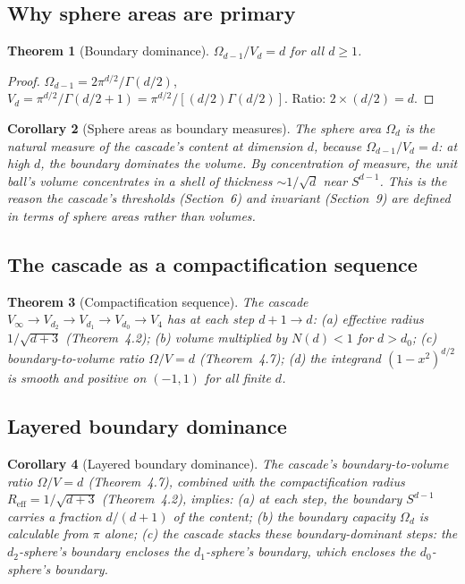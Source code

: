 \documentclass[11pt,a4paper]{article}
\newtheorem{theorem}{Theorem}[section]
\newtheorem{corollary}[theorem]{Corollary}
\begin{document}
\subsection{Why sphere areas are primary}

\begin{theorem}[Boundary dominance]
$\Omega_{d-1}/V_d = d$ for all $d\geq 1$.
\end{theorem}

\begin{proof}
$\Omega_{d-1} = 2\pi^{d/2}/\Gamma(d/2)$, $V_d = \pi^{d/2}/\Gamma(d/2+1) = \pi^{d/2}/[(d/2)\Gamma(d/2)]$. Ratio: $2\times(d/2) = d$.
\end{proof}

\begin{corollary}[Sphere areas as boundary measures]
The sphere area $\Omega_d$ is the natural measure of the cascade's content at dimension $d$, because $\Omega_{d-1}/V_d = d$: at high $d$, the boundary dominates the volume. By concentration of measure, the unit ball's volume concentrates in a shell of thickness $\sim 1/\sqrt{d}$ near $S^{d-1}$. This is the reason the cascade's thresholds (Section~6) and invariant (Section~9) are defined in terms of sphere areas rather than volumes.
\end{corollary}

\subsection{The cascade as a compactification sequence}

\begin{theorem}[Compactification sequence]
The cascade $V_\infty\to V_{d_2}\to V_{d_1}\to V_{d_0}\to V_4$ has at each step $d+1\to d$: (a) effective radius $1/\sqrt{d+3}$ (Theorem~4.2); (b) volume multiplied by $N(d)<1$ for $d>d_0$; (c) boundary-to-volume ratio $\Omega/V = d$ (Theorem~4.7); (d) the integrand $(1-x^2)^{d/2}$ is smooth and positive on $(-1,1)$ for all finite $d$.
\end{theorem}

\subsection{Layered boundary dominance}

\begin{corollary}[Layered boundary dominance]
The cascade's boundary-to-volume ratio $\Omega/V = d$ (Theorem~4.7), combined with the compactification radius $R_{\mathrm{eff}} = 1/\sqrt{d+3}$ (Theorem~4.2), implies: (a) at each step, the boundary $S^{d-1}$ carries a fraction $d/(d+1)$ of the content; (b) the boundary capacity $\Omega_d$ is calculable from $\pi$ alone; (c) the cascade stacks these boundary-dominant steps: the $d_2$-sphere's boundary encloses the $d_1$-sphere's boundary, which encloses the $d_0$-sphere's boundary.
\end{corollary}
\end{document}

